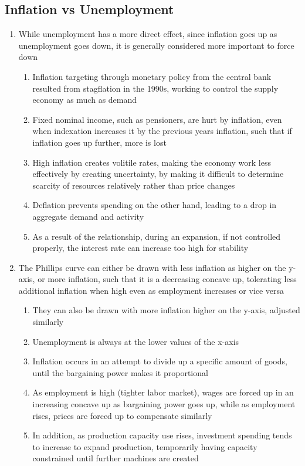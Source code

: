 \subsection{Inflation vs Unemployment}
\begin{enumerate}
\item While unemployment has a more direct effect, since inflation goes up as unemployment goes down, it is generally considered more important to force down
\begin{enumerate}
\item Inflation targeting through monetary policy from the central bank resulted from stagflation in the 1990s, working to control the supply economy as much as demand
\item Fixed nominal income, such as pensioners, are hurt by inflation, even when indexation increases it by the previous years inflation, such that if inflation goes up further, more is lost
\item High inflation creates volitile rates, making the economy work less effectively by creating uncertainty, by making it difficult to determine scarcity of resources relatively rather than price changes
\item Deflation prevents spending on the other hand, leading to a drop in aggregate demand and activity
\item As a result of the relationship, during an expansion, if not controlled properly, the interest rate can increase too high for stability
\end{enumerate}
\item The Phillips curve can either be drawn with less inflation as higher on the y-axis, or more inflation, such that it is a decreasing concave up, tolerating less additional inflation when high even as employment increases or vice versa
\begin{enumerate}
\item They can also be drawn with more inflation higher on the y-axis, adjusted similarly
\item Unemployment is always at the lower values of the x-axis
\item Inflation occurs in an attempt to divide up a specific amount of goods, until the bargaining power makes it proportional
\item As employment is high (tighter labor market), wages are forced up in an increasing concave up as bargaining power goes up, while as employment rises, prices are forced up to compensate similarly
\item In addition, as production capacity use rises, investment spending tends to increase to expand production, temporarily having capacity constrained until further machines are created

\end{enumerate}
\end{enumerate}
